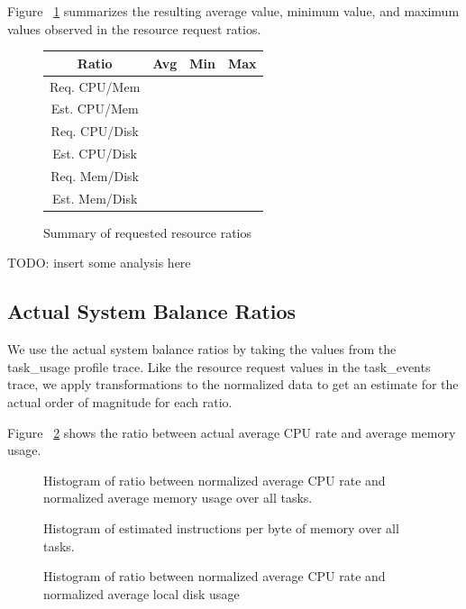 \documentclass{sig-alternate}
\begin{document}
Figure ~\ref{request_summary} summarizes the resulting average value, minimum value, and maximum values observed in the resource request ratios.

\begin{figure}
\centering
\begin{tabular}{| c | c | c | c |} \hline
Ratio & Avg & Min & Max \\ \hline
Req. CPU/Mem & & & \\ \hline
Est. CPU/Mem & & & \\ \hline
Req. CPU/Disk & & & \\ \hline
Est. CPU/Disk & & & \\ \hline
Req. Mem/Disk & & & \\ \hline
Est. Mem/Disk & & & \\ \hline
\end{tabular}
\label{request_summary}
\caption{Summary of requested resource ratios}
\end{figure}

TODO: insert some analysis here

\subsection{Actual System Balance Ratios}

We use the actual system balance ratios by taking the values from the task\_usage profile trace.
Like the resource request values in the task\_events trace, we apply transformations to the normalized data to get an estimate for the actual order of magnitude for each ratio.

Figure ~\ref{act_cpu_mem} shows the ratio between actual average CPU rate and average memory usage.

\begin{figure}
\centering
\label{act_cpu_mem}
\caption{Histogram of ratio between normalized average CPU rate and normalized average memory usage over all tasks.}
\end{figure}

\begin{figure}
\centering
\label{est_act_cpu_mem}
\caption{Histogram of estimated instructions per byte of memory over all tasks.}
\end{figure}


\begin{figure}
\centering
\label{act_cpu_disk}
\caption{Histogram of ratio between normalized average CPU rate and normalized average local disk usage}
\end{figure}
\end{document}
